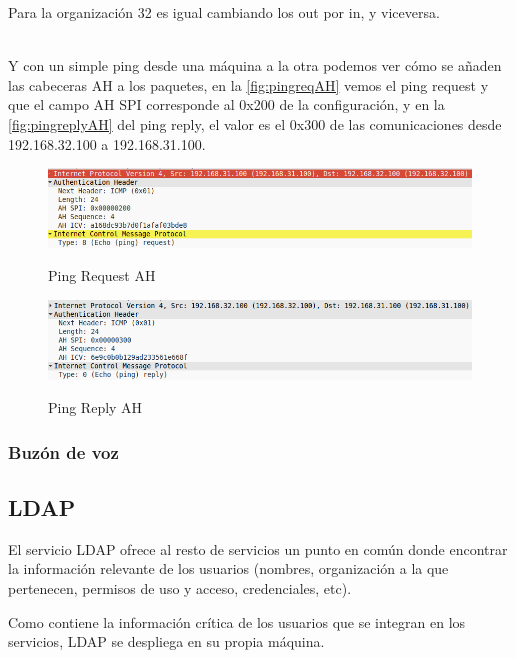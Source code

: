 \documentclass[]{article}
\begin{document}
Para la organización 32 es igual cambiando los out por in, y viceversa.

\hfill
\\


Y con un simple ping desde una máquina a la otra podemos ver cómo se añaden las cabeceras AH a los paquetes, en la \autoref{fig:pingreqAH} vemos el ping request y que el campo AH SPI corresponde al 0x200 de la configuración, y en la \autoref{fig:pingreplyAH} del ping reply, el valor es el 0x300 de las comunicaciones desde 192.168.32.100 a 192.168.31.100.


\begin{figure}[h!]
	\caption{Ping Request AH}
	\centering
	\includegraphics[scale=0.5]{images/ipsec/pingreqAH.png}
	\label{fig:pingreqAH}
\end{figure}

\begin{figure}[h!]
	\caption{Ping Reply AH}
	\centering
	\includegraphics[scale=0.5]{images/ipsec/pingreplyAH.png}
	\label{fig:pingreplyAH}
\end{figure}



\subsubsection{Buzón de voz}





\subsection{LDAP}

El servicio LDAP ofrece al resto de servicios un punto en común donde encontrar la información relevante de los usuarios (nombres,
organización a la que pertenecen, permisos de uso y acceso, credenciales, etc).

Como contiene la información crítica de los usuarios que se integran en los servicios, LDAP se despliega en su propia máquina.
\end{document}

